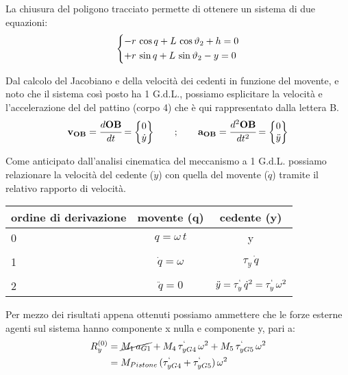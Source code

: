 \begin{enumerate}
 		La chiusura del poligono tracciato permette di ottenere un sistema di due equazioni:
 		\[
 		\begin{dcases}
 			-r\,\cos{q} + L\,\cos{\theta_2} + h = 0\\
 			+r\,\sin{q} + L\,\sin{\theta_2} - y =0
 		\end{dcases}
 		\]
 		
 		Dal calcolo del Jacobiano e della velocità dei cedenti in funzione del movente, e noto che il sistema così posto ha 1 G.d.L., possiamo esplicitare la velocità e l'accelerazione del del pattino (corpo 4) che è qui rappresentato dalla lettera B.
 		\begin{gather*}
 			\mathbf{v_{OB}} = \td{\mathbf{OB}}{t} = \B{0\\\dot{y}}\qquad;\qquad\mathbf{a_{OB}} = \tdd{\mathbf{OB}}{t} = \B{0\\\ddot{y}}
 		\end{gather*}
 		
 		Come anticipato dall'analisi cinematica del meccanismo a 1 G.d.L. possiamo relazionare la velocità del cedente ($\dot{y}$) con quella del movente ($\dot{q}$) tramite il relativo rapporto di velocità.
 		
 		\begin{minipage}{.5\textwidth}
 		\begin{tabular}{lcc}
 		ordine di derivazione & movente (q)& cedente (y)\\
 		\midrule
 		0&$q=\omega\,t$& y\\
 		&&\\
 		1&$\dot{q} = \omega$& $\tau_y\,\dot{q}$\\
 		&&\\
 		2&$\ddot{q} = 0$&$\ddot{y} = \tau_y^{`}\,\dot{q}^2 = \tau_y^{`}\,\omega^2$
 		\end{tabular}
 		\end{minipage}
 		\hfill
 		\begin{minipage}{.4\textwidth}
		Per mezzo dei risultati appena ottenuti possiamo ammettere che le forze esterne agenti sul sistema hanno componente x nulla e componente y, pari a:
		\begin{align*}
		R_y^{(0)}& = \cancel{M_1\,a_{G1}} + M_4\,\tau_{yG4}^{`}\,\omega^2 + M_5\,\tau_{yG5}^{`}\,\omega^2\\
		&= M_{Pistone}\,(\tau_{yG4}^{`} + \tau_{yG5}^{`})\,\omega^2
		\end{align*}
 		\end{minipage}
		\end{enumerate}
		
